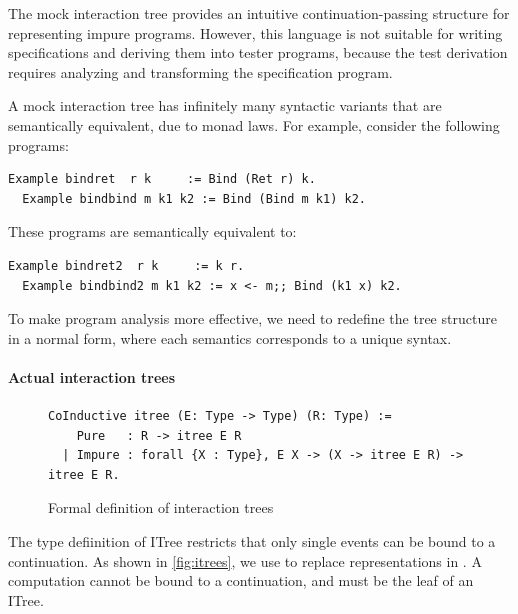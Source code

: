 The mock interaction tree provides an intuitive continuation-passing structure
for representing impure programs.  However, this language is not suitable for
writing specifications and deriving them into tester programs, because the test
derivation requires analyzing and transforming the specification program.

A mock interaction tree has infinitely many syntactic variants that are
semantically equivalent, due to monad laws.  For example, consider the following
programs:
\begin{lstlisting}[style=customcoq]
  Example bindret  r k     := Bind (Ret r) k.
  Example bindbind m k1 k2 := Bind (Bind m k1) k2.
\end{lstlisting}
These programs are semantically equivalent to:
\begin{lstlisting}[style=customcoq]
  Example bindret2  r k     := k r.
  Example bindbind2 m k1 k2 := x <- m;; Bind (k1 x) k2.
\end{lstlisting}

To make program analysis more effective, we need to redefine the tree structure
in a normal form, where each semantics corresponds to a unique syntax.

\paragraph{Actual interaction trees}
\begin{figure}
\begin{lstlisting}[style=customcoq]
  CoInductive itree (E: Type -> Type) (R: Type) :=
    Pure   : R -> itree E R
  | Impure : forall {X : Type}, E X -> (X -> itree E R) -> itree E R.
\end{lstlisting}
\caption{Formal definition of interaction trees}
\label{fig:itrees}
\end{figure}
The type defiinition of ITree restricts that only single events can be bound to
a continuation.  As shown in \autoref{fig:itrees}, we use  to
replace  representations in .  A
 computation cannot be bound to a continuation, and must be the leaf
of an ITree.

